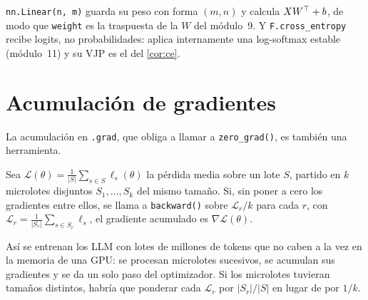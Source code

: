 \addtocounter{figure}{1}%

\addtocounter{definicion}{1}%

\begin{observacion}
\texttt{nn.Linear(n, m)} guarda su peso con forma $(m,n)$ y calcula $XW^{\top}+b$, de modo que \texttt{weight} es la traspuesta de la $W$ del módulo~9. Y \texttt{F.cross\_entropy} recibe logits, no probabilidades: aplica internamente una log-softmax estable (módulo~11) y su VJP es el del \cref{cor:ce}.
\end{observacion}

\section{Acumulación de gradientes}

La acumulación en \texttt{.grad}, que obliga a llamar a \texttt{zero\_grad()}, es también una herramienta.

\begin{proposicion}[Microlotes]\label{prop:microlotes}
Sea $\mathcal L(\theta)=\frac1{|S|}\sum_{s\in S}\ell_s(\theta)$ la pérdida media sobre un lote $S$, partido en $k$ microlotes disjuntos $S_1,\dots,S_k$ del mismo tamaño. Si, sin poner a cero los gradientes entre ellos, se llama a \texttt{backward()} sobre $\mathcal L_r/k$ para cada $r$, con $\mathcal L_r=\frac1{|S_r|}\sum_{s\in S_r}\ell_s$, el gradiente acumulado es $\nabla\mathcal L(\theta)$.
\end{proposicion}

Así se entrenan los LLM con lotes de millones de tokens que no caben a la vez en la memoria de una GPU: se procesan microlotes sucesivos, se acumulan sus gradientes y se da un solo paso del optimizador. Si los microlotes tuvieran tamaños distintos, habría que ponderar cada $\mathcal L_r$ por $|S_r|/|S|$ en lugar de por $1/k$.

